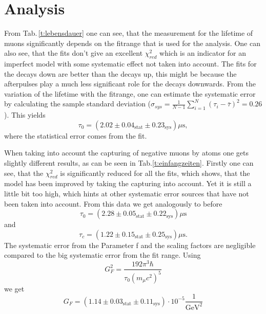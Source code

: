 \section{Analysis}

From Tab.\,\ref{t:lebensdauer} one can see, that the measurement for the lifetime of muons significantly depends on the fitrange that is used for the analysis. One can also see, that the fits don't give an excellent $\chi^2_{red}$ which is an indicator for an imperfect model with some systematic effect not taken into account. The fits for the decays down are better than the decays up, this might be because the afterpulses play a much less significant role for the decays downwards. From the variation of the lifetime with the fitrange, one can estimate the systematic error by calculating the sample standard deviation ($\sigma_{sys} = \frac{1}{N-1}\sum_{i=1}^N(\tau_i-\bar{\tau})^2 = 0.26$). This yields 
\begin{equation}
	\tau_0 = (2.02\pm0.04_{\text{stat}}\pm0.23_{\text{sys}})\mu\text{s},
\end{equation}
where the statistical error comes from the fit. 

When taking into account the capturing of negative muons by atoms one gets slightly different results, as can be seen in Tab.\ref{t:einfangzeiten}. Firstly one can see, that the $\chi^2_{red}$ is significantly reduced for all the fits, which shows, that the model has been improved by taking the capturing into account. Yet it is still a little bit too high, which hints at other systematic error sources that have not been taken into account. 
From this data we get analogously to before
\begin{equation}
	\tau_0 = (2.28\pm0.05_{\text{stat}}\pm0.22_{\text{sys}})\mu\text{s}
\end{equation}
and
\begin{equation}
	\tau_c = (1.22\pm0.15_{\text{stat}}\pm0.25_{\text{sys}})\mu\text{s}.
\end{equation}
The systematic error from the Parameter f and the scaling factors are negligible compared to the big systematic error from the fit range. Using
\begin{equation}
	G_F^2 = \frac{192\pi^3\hbar}{\tau_0(m_\mu c^2)^5}
\end{equation}
we get
\begin{equation}
	G_F = (1.14 \pm 0.03_{\text{stat}} \pm 0.11_{\text{sys}})\cdot 10^{-5}\frac{1}{\text{GeV}^2}
\end{equation}

